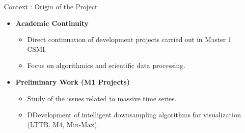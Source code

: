 \documentclass[professionalfonts,aspectratio=169]{beamer}
\begin{document}
\begin{frame}{Context : Origin of the Project}
    \vspace{0.3cm}
    
    \begin{itemize}
        \item \textbf{Academic Continuity}
        \begin{itemize}
            \item Direct continuation of development projects carried out in Master 1 CSMI.
            \item Focus on algorithmics and scientific data processing.
        \end{itemize}
        
        \vspace{0.4cm}
        
        \item \textbf{Preliminary Work (M1 Projects)}
        \begin{itemize}
            \item Study of the issues related to massive time series.
            \item DDevelopment of intelligent downsampling algorithms for visualization (LTTB, M4, Min-Max).
        \end{itemize}
    \end{itemize}

\end{frame}



\end{document}
